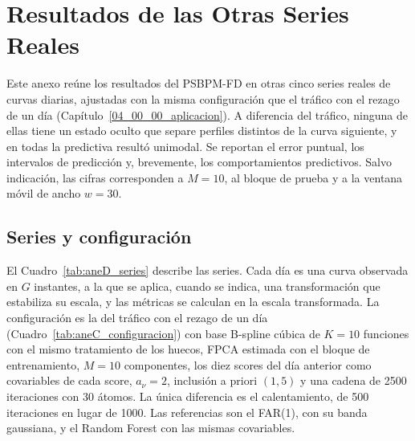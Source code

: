 \chapter{Resultados de las Otras Series Reales}
\label{aneD_00_00_otras_series}


Este anexo reúne los resultados del PSBPM-FD en otras cinco series reales de curvas diarias, ajustadas con la misma configuración que el tráfico con el rezago de un día (Capítulo~\ref{04_00_00_aplicacion}). A diferencia del tráfico, ninguna de ellas tiene un estado oculto que separe perfiles distintos de la curva siguiente, y en todas la predictiva resultó unimodal. Se reportan el error puntual, los intervalos de predicción y, brevemente, los comportamientos predictivos. Salvo indicación, las cifras corresponden a $M = 10$, al bloque de prueba y a la ventana móvil de ancho $w = 30$.

\section{Series y configuración}
\label{aneD_00_01_series}

El Cuadro~\ref{tab:aneD_series} describe las series. Cada día es una curva observada en $G$ instantes, a la que se aplica, cuando se indica, una transformación que estabiliza su escala, y las métricas se calculan en la escala transformada. La configuración es la del tráfico con el rezago de un día (Cuadro~\ref{tab:aneC_configuracion}) con base B-spline cúbica de $K = 10$ funciones con el mismo tratamiento de los huecos, FPCA estimada con el bloque de entrenamiento, $M = 10$ componentes, los diez scores del día anterior como covariables de cada score, $a_\nu = 2$, inclusión a priori $(1, 5)$ y una cadena de 2500 iteraciones con 30 átomos. La única diferencia es el calentamiento, de 500 iteraciones en lugar de 1000. Las referencias son el FAR(1), con su banda gaussiana, y el Random Forest con las mismas covariables.

